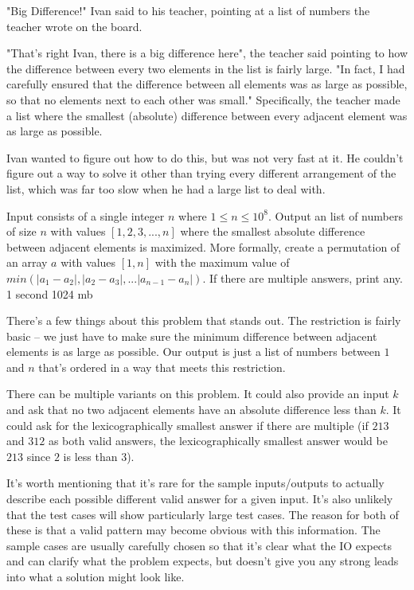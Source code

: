 {"Big Difference!" Ivan said to his teacher, pointing at a list of numbers the teacher wrote on the board.

"That's right Ivan, there is a big difference here", the teacher said pointing to how the difference between every two elements in the list is fairly large. "In fact, I had carefully ensured that the difference between all elements was as large as possible, so that no elements next to each other was small." Specifically, the teacher made a list where the smallest (absolute) difference between every adjacent element was as large as possible.

Ivan wanted to figure out how to do this, but was not very fast at it. He couldn't figure out a way to solve it other than trying every different arrangement of the list, which was far too slow when he had a large list to deal with.}
{Input consists of a single integer $n$ where $1 \le n \le 10^8$.}
{Output an list of numbers of size $n$ with values $[1,2,3,...,n]$ where the smallest absolute difference between adjacent elements is maximized. More formally, create a permutation of an array $a$ with values $[1,n]$ with the maximum value of $min(|a_1-a_2|, |a_2-a_3|, ... |a_{n-1}-a_{n}|)$. If there are multiple answers, print any.}
{1 second}
{1024 mb}
{
}

\hrulefill

There's a few things about this problem that stands out. The restriction is fairly basic -- we just have to make sure the minimum difference between adjacent elements is as large as possible. Our output is just a list of numbers between $1$ and $n$ that's ordered in a way that meets this restriction.

There can be multiple variants on this problem. It could also provide an input $k$ and ask that no two adjacent elements have an absolute difference less than $k$. It could ask for the lexicographically smallest answer if there are multiple (if $2 1 3$ and $3 1 2$ as both valid answers, the lexicographically smallest answer would be $2 1 3$ since $2$ is less than $3$).

It's worth mentioning that it's rare for the sample inputs/outputs to actually describe each possible different valid answer for a given input. It's also unlikely that the test cases will show particularly large test cases. The reason for both of these is that a valid pattern may become obvious with this information. The sample cases are usually carefully chosen so that it's clear what the IO expects and can clarify what the problem expects, but doesn't give you any strong leads into what a solution might look like.
